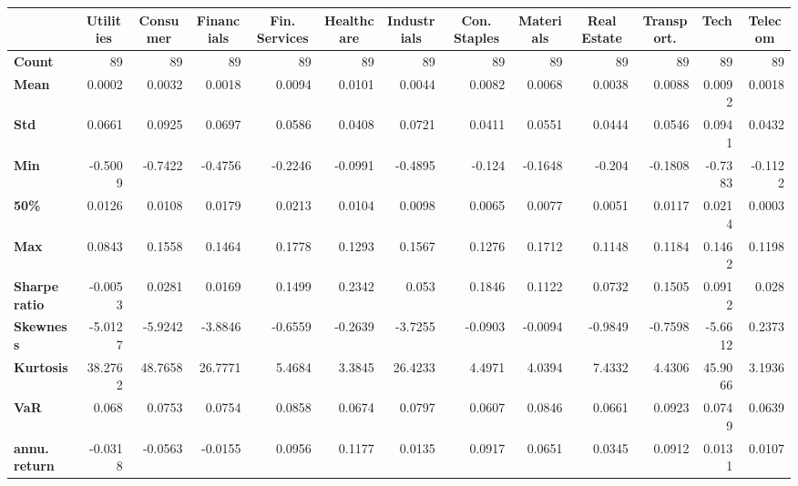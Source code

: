 \documentclass{article}
\begin{document}
\begin{landscape}
\begin{table}[h]
   \begin{tabular}{lrrrrrrrrrrrr}
    \toprule
          & \multicolumn{1}{c}{\textbf{Utilities}} & \multicolumn{1}{c}{\textbf{Consumer}} & \multicolumn{1}{c}{\textbf{Financials}} & \multicolumn{1}{c}{\textbf{Fin. Services}} & \multicolumn{1}{c}{\textbf{Healthcare}} & \multicolumn{1}{c}{\textbf{Industrials}} & \multicolumn{1}{c}{\textbf{Con. Staples}} & \multicolumn{1}{c}{\textbf{Materials}} & \multicolumn{1}{c}{\textbf{Real Estate}} & \multicolumn{1}{c}{\textbf{Transport.}} & \multicolumn{1}{c}{\textbf{Tech}} & \multicolumn{1}{c}{\textbf{Telecom}} \\
    \midrule
    \midrule
    \textbf{Count} & 89    & 89    & 89    & 89    & 89    & 89    & 89    & 89    & 89    & 89    & 89    & 89 \\
    \textbf{Mean} & 0.0002 & 0.0032 & 0.0018 & 0.0094 & 0.0101 & 0.0044 & 0.0082 & 0.0068 & 0.0038 & 0.0088 & 0.0092 & 0.0018 \\
    \textbf{Std} & 0.0661 & 0.0925 & 0.0697 & 0.0586 & 0.0408 & 0.0721 & 0.0411 & 0.0551 & 0.0444 & 0.0546 & 0.0941 & 0.0432 \\
    \textbf{Min} & -0.5009 & -0.7422 & -0.4756 & -0.2246 & -0.0991 & -0.4895 & -0.124 & -0.1648 & -0.204 & -0.1808 & -0.7383 & -0.1122 \\
    \textbf{50\%} & 0.0126 & 0.0108 & 0.0179 & 0.0213 & 0.0104 & 0.0098 & 0.0065 & 0.0077 & 0.0051 & 0.0117 & 0.0214 & 0.0003 \\
    \textbf{Max} & 0.0843 & 0.1558 & 0.1464 & 0.1778 & 0.1293 & 0.1567 & 0.1276 & 0.1712 & 0.1148 & 0.1184 & 0.1462 & 0.1198 \\
    \textbf{Sharpe ratio} & -0.0053 & 0.0281 & 0.0169 & 0.1499 & 0.2342 & 0.053 & 0.1846 & 0.1122 & 0.0732 & 0.1505 & 0.0912 & 0.028 \\
    \textbf{Skewness} & -5.0127 & -5.9242 & -3.8846 & -0.6559 & -0.2639 & -3.7255 & -0.0903 & -0.0094 & -0.9849 & -0.7598 & -5.6612 & 0.2373 \\
    \textbf{Kurtosis} & 38.2762 & 48.7658 & 26.7771 & 5.4684 & 3.3845 & 26.4233 & 4.4971 & 4.0394 & 7.4332 & 4.4306 & 45.9066 & 3.1936 \\
    \textbf{VaR} & 0.068 & 0.0753 & 0.0754 & 0.0858 & 0.0674 & 0.0797 & 0.0607 & 0.0846 & 0.0661 & 0.0923 & 0.0749 & 0.0639 \\
    \textbf{annu. return} & -0.0318 & -0.0563 & -0.0155 & 0.0956 & 0.1177 & 0.0135 & 0.0917 & 0.0651 & 0.0345 & 0.0912 & 0.0131 & 0.0107 \\
    \bottomrule
    \end{tabular}%


\end{table}%
\end{landscape}
\end{document}
